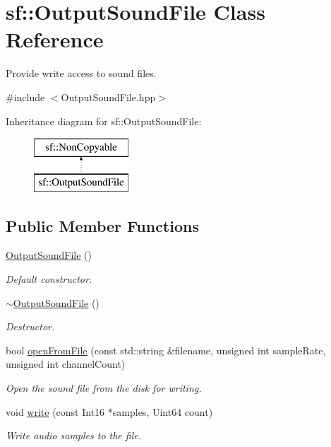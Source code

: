 \hypertarget{classsf_1_1_output_sound_file}{}\section{sf\+:\+:Output\+Sound\+File Class Reference}
\label{classsf_1_1_output_sound_file}


Provide write access to sound files.  




{\ttfamily \#include $<$Output\+Sound\+File.\+hpp$>$}

Inheritance diagram for sf\+:\+:Output\+Sound\+File\+:\begin{figure}[H]
\begin{center}
\leavevmode
\includegraphics[height=2.000000cm]{classsf_1_1_output_sound_file}
\end{center}
\end{figure}
\subsection*{Public Member Functions}
\begin{DoxyCompactItemize}
\item 
\mbox{\label{classsf_1_1_output_sound_file_a7ae9f2dbd0991fa9394726a3d58bb19e}} 
\hyperlink{classsf_1_1_output_sound_file_a7ae9f2dbd0991fa9394726a3d58bb19e}{Output\+Sound\+File} ()
\begin{DoxyCompactList}\small\item\em Default constructor. \end{DoxyCompactList}\item 
\hyperlink{classsf_1_1_output_sound_file_a1492adbfef1f391d720afb56f068182e}{$\sim$\+Output\+Sound\+File} ()
\begin{DoxyCompactList}\small\item\em Destructor. \end{DoxyCompactList}\item 
bool \hyperlink{classsf_1_1_output_sound_file_ae5e55f01c53c1422c44eaed2eed67fce}{open\+From\+File} (const std\+::string \&filename, unsigned int sample\+Rate, unsigned int channel\+Count)
\begin{DoxyCompactList}\small\item\em Open the sound file from the disk for writing. \end{DoxyCompactList}\item 
void \hyperlink{classsf_1_1_output_sound_file_adfcf525fced71121f336fa89faac3d67}{write} (const Int16 $\ast$samples, Uint64 count)
\begin{DoxyCompactList}\small\item\em Write audio samples to the file. \end{DoxyCompactList}\end{DoxyCompactItemize}


